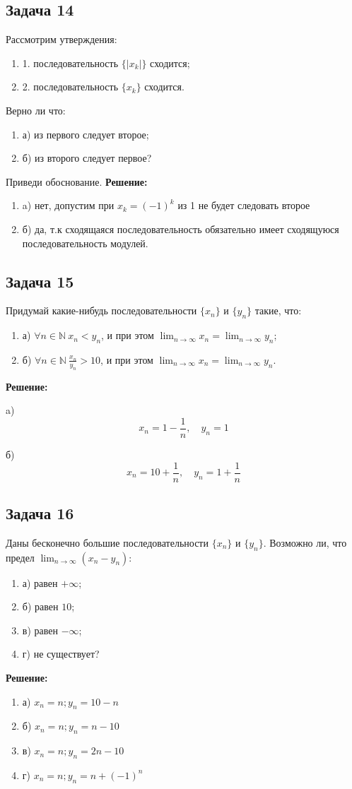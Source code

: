 \documentclass[a4paper,12pt]{article}
\begin{document}
\subsection{Задача 14}
Рассмотрим утверждения:
\begin{enumerate}
    \item 1. последовательность $\{|x_k|\}$ сходится;
    \item 2. последовательность $\{x_k\}$ сходится.
\end{enumerate}
Верно ли что:
\begin{enumerate}
    \item а) из первого следует второе;
    \item б) из второго следует первое?
\end{enumerate}
Приведи обоснование.
\textbf{Решение: }
\begin{enumerate}
    \item a) нет, допустим при $x_k=(-1)^k$ из 1 не будет следовать второе
    \item б) да, т.к сходящаяся последовательность обязательно имеет сходящуюся последовательность модулей.
\end{enumerate}

\subsection{Задача 15}
Придумай какие-нибудь последовательности $\{x_n\}$ и $\{y_n\}$ такие, что:
\begin{enumerate}
    \item а) $\forall n \in \mathbb{N} \ x_n < y_n$, и при этом $\lim_{n \to \infty} x_n = \lim_{n \to \infty} y_n$;
    \item б) $\forall n \in \mathbb{N} \ \frac{x_n}{y_n} > 10$, и при этом $\lim_{n \to \infty} x_n = \lim_{n \to \infty} y_n$.
\end{enumerate}
\textbf{Решение: }

a)
   \[
   x_n = 1 - \frac{1}{n}, \quad y_n = 1
   \]

б)
   \[
   x_n = 10 + \frac{1}{n}, \quad y_n = 1 + \frac{1}{n}
   \]

\subsection{Задача 16}
Даны бесконечно большие последовательности $\{x_n\}$ и $\{y_n\}$. Возможно ли, что предел $\lim_{n \to \infty} (x_n - y_n)$:
\begin{enumerate}
    \item а) равен $+\infty$;
    \item б) равен $10$;
    \item в) равен $-\infty$;
    \item г) не существует?
\end{enumerate}
\textbf{Решение: }
\begin{enumerate}
    \item а) $x_n = n; y_n = 10-n$
    \item б) $x_n = n; y_n = n-10$
    \item в) $x_n = n; y_n = 2n-10$
    \item г) $x_n = n; y_n = n+(-1)^n$
\end{enumerate}
\end{document}
